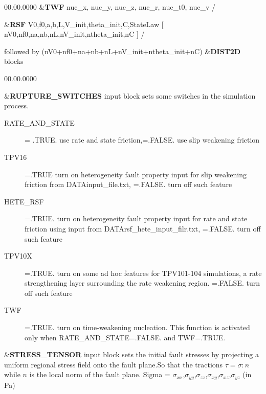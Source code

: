 \begin{lyxlist}{00.00.0000}
\&\textbf{TWF} nuc\_x, nuc\_y, nuc\_z, nuc\_r, nuc\_t0, nuc\_v /

\&\textbf{RSF} V0,f0,a,b,L,V\_init,theta\_init,C,StateLaw {[} nV0,nf0,na,nb,nL,nV\_init,ntheta\_init,nC {]} /



followed by (nV0+nf0+na+nb+nL+nV\_init+ntheta\_init+nC) \&\textbf{DIST2D} blocks\\

\begin{lyxlist}{00.00.0000}
\item [{\&\textbf{RUPTURE\_SWITCHES}}] input block sets some switches in the simulation process.
  \begin{description}
    \item [{RATE\_AND\_STATE}]
         = .TRUE. use rate and state friction,=.FALSE. use slip weakening friction
    \item [{TPV16}]
         =.TRUE turn on heterogeneity fault property input for slip weakening friction from DATA\/input\_file.txt,
         =.FALSE. turn off such feature
    \item [{HETE\_RSF}]
         =.TRUE. turn on heterogeneity fault property input for rate and state friction
              using input from DATA\/rsf\_hete\_input\_filr.txt,
   =.FALSE. turn off such feature
    \item[{TPV10X}]
         =.TRUE. turn on some ad hoc features for TPV101-104 simulations, a rate strengthening
   layer surrounding the rate weakening region.
   =.FALSE. turn off such feature
    \item[{TWF}]
         =.TRUE. turn on time-weakening nucleation. This function is activated only when
         RATE\_AND\_STATE=.FALSE. and TWF=.TRUE.
   \end{description}

\item [{\&\textbf{STRESS\_TENSOR}}] input block sets the initial fault stresses
  by projecting a uniform regional stress field onto the fault plane.So that the
  tractions $\tau = \sigma : n$ while $n$ is the local norm of the fault plane.
  Sigma =  $\sigma_{xx}$,$\sigma_{yy}$,$\sigma_{zz}$,$\sigma_{xy}$,$\sigma_{xz}$,$\sigma_{yz}$
  (in Pa)


\end{lyxlist}
\end{lyxlist}
